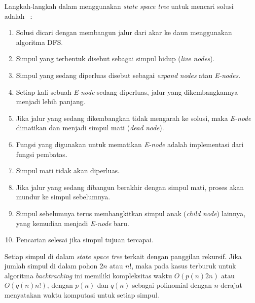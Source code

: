 \documentclass[a4paper,twoside]{article}
\begin{document}
\begin{enumerate}
Langkah-langkah dalam menggunakan \textit{state space tree} untuk mencari solusi adalah ~\cite{Fahda}:
\begin{enumerate}
\item Solusi dicari dengan membangun jalur dari akar ke daun menggunakan algoritma DFS.
\item Simpul yang terbentuk disebut sebagai simpul hidup (\textit{live nodes}).
\item Simpul yang sedang diperluas disebut sebagai \textit{expand nodes} atau \textit{E-nodes}.
\item Setiap kali sebuah \textit{E-node} sedang diperluas, jalur yang dikembangkannya menjadi lebih panjang.
\item Jika jalur yang sedang dikembangkan tidak mengarah ke solusi, maka \textit{E-node} dimatikan dan menjadi simpul mati (\textit{dead node}).
\item Fungsi yang digunakan untuk mematikan \textit{E-node} adalah implementasi dari fungsi pembatas.
\item Simpul mati tidak akan diperluas.
\item Jika jalur yang sedang dibangun berakhir dengan simpul mati, proses akan mundur ke simpul sebelumnya.
\item Simpul sebelumnya terus membangkitkan simpul anak (\textit{child node}) lainnya, yang kemudian menjadi \textit{E-node} baru.
\item Pencarian selesai jika simpul tujuan tercapai.
\end{enumerate}
Setiap simpul di dalam \textit{state space tree} terkait dengan panggilan rekursif. Jika jumlah simpul di dalam pohon \begin{math}2n\end{math} atau \begin{math}n!\end{math}, maka pada kasus terburuk untuk algoritma \textit{backtracking} ini memiliki kompleksitas waktu \begin{math}O(p(n)2n)\end{math} atau \begin{math}O(q(n)n!)\end{math}, dengan \begin{math}p(n)\end{math} dan \begin{math}q(n)\end{math} sebagai polinomial dengan \begin{math}n\end{math}-derajat menyatakan waktu komputasi untuk setiap simpul.


\end{enumerate}
\end{document}
